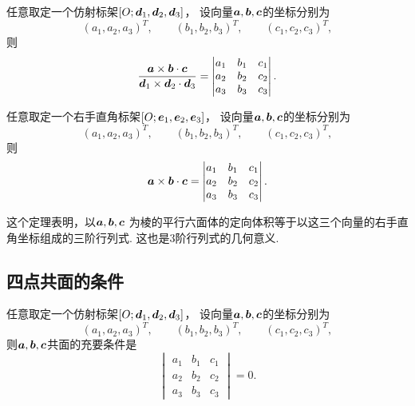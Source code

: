 \begin{theorem}
任意取定一个仿射标架\([O;\boldsymbol{d}_1,\boldsymbol{d}_2,\boldsymbol{d}_3]\)，
设向量\(\boldsymbol{a},\boldsymbol{b},\boldsymbol{c}\)的坐标分别为\[
	(a_1,a_2,a_3)^T, \qquad
	(b_1,b_2,b_3)^T, \qquad
	(c_1,c_2,c_3)^T,
\]
则\begin{equation}
	\frac{\boldsymbol{a}\times\boldsymbol{b}\cdot\boldsymbol{c}}{\boldsymbol{d}_1\times\boldsymbol{d}_2\cdot\boldsymbol{d}_3}
	= \begin{vmatrix}
		a_1 & b_1 & c_1 \\
		a_2 & b_2 & c_2 \\
		a_3 & b_3 & c_3
	\end{vmatrix}.
\end{equation}
\end{theorem}

\begin{theorem}
任意取定一个右手直角标架\([O;\boldsymbol{e}_1,\boldsymbol{e}_2,\boldsymbol{e}_3]\)，
设向量\(\boldsymbol{a},\boldsymbol{b},\boldsymbol{c}\)的坐标分别为\[
	(a_1,a_2,a_3)^T, \qquad
	(b_1,b_2,b_3)^T, \qquad
	(c_1,c_2,c_3)^T,
\]
则\begin{equation}
	\boldsymbol{a}\times\boldsymbol{b}\cdot\boldsymbol{c}
	= \begin{vmatrix}
		a_1 & b_1 & c_1 \\
		a_2 & b_2 & c_2 \\
		a_3 & b_3 & c_3
	\end{vmatrix}.
\end{equation}
\end{theorem}
这个定理表明，以\(\boldsymbol{a},\boldsymbol{b},\boldsymbol{c}\)
为棱的平行六面体的定向体积等于以这三个向量的右手直角坐标组成的三阶行列式.
这也是3阶行列式的几何意义.

\subsection{四点共面的条件}
\begin{theorem}
任意取定一个仿射标架\([O;\boldsymbol{d}_1,\boldsymbol{d}_2,\boldsymbol{d}_3]\)，
设向量\(\boldsymbol{a},\boldsymbol{b},\boldsymbol{c}\)的坐标分别为\[
	(a_1,a_2,a_3)^T, \qquad
	(b_1,b_2,b_3)^T, \qquad
	(c_1,c_2,c_3)^T,
\]
则\(\boldsymbol{a},\boldsymbol{b},\boldsymbol{c}\)共面的充要条件是\[
	\begin{vmatrix}
		a_1 & b_1 & c_1 \\
		a_2 & b_2 & c_2 \\
		a_3 & b_3 & c_3
	\end{vmatrix} = 0.
\]
\end{theorem}

